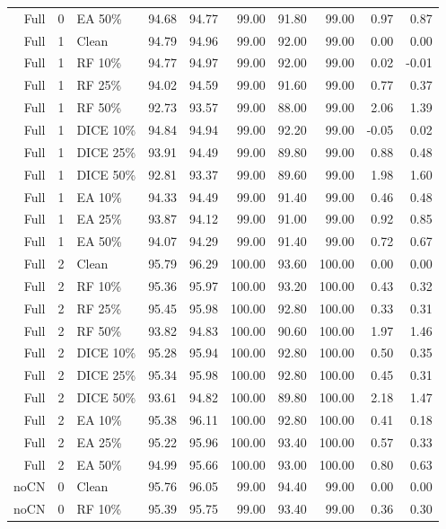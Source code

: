 {\begin{longtable}{rllrrrrrrr}
Full & 0 & EA 50\% & 94.68 & 94.77 & 99.00 & 91.80 & 99.00 & 0.97 & 0.87 \\
Full & 1 & Clean & 94.79 & 94.96 & 99.00 & 92.00 & 99.00 & 0.00 & 0.00 \\
Full & 1 & RF 10\% & 94.77 & 94.97 & 99.00 & 92.00 & 99.00 & 0.02 & -0.01 \\
Full & 1 & RF 25\% & 94.02 & 94.59 & 99.00 & 91.60 & 99.00 & 0.77 & 0.37 \\
Full & 1 & RF 50\% & 92.73 & 93.57 & 99.00 & 88.00 & 99.00 & 2.06 & 1.39 \\
Full & 1 & DICE 10\% & 94.84 & 94.94 & 99.00 & 92.20 & 99.00 & -0.05 & 0.02 \\
Full & 1 & DICE 25\% & 93.91 & 94.49 & 99.00 & 89.80 & 99.00 & 0.88 & 0.48 \\
Full & 1 & DICE 50\% & 92.81 & 93.37 & 99.00 & 89.60 & 99.00 & 1.98 & 1.60 \\
Full & 1 & EA 10\% & 94.33 & 94.49 & 99.00 & 91.40 & 99.00 & 0.46 & 0.48 \\
Full & 1 & EA 25\% & 93.87 & 94.12 & 99.00 & 91.00 & 99.00 & 0.92 & 0.85 \\
Full & 1 & EA 50\% & 94.07 & 94.29 & 99.00 & 91.40 & 99.00 & 0.72 & 0.67 \\
Full & 2 & Clean & 95.79 & 96.29 & 100.00 & 93.60 & 100.00 & 0.00 & 0.00 \\
Full & 2 & RF 10\% & 95.36 & 95.97 & 100.00 & 93.20 & 100.00 & 0.43 & 0.32 \\
Full & 2 & RF 25\% & 95.45 & 95.98 & 100.00 & 92.80 & 100.00 & 0.33 & 0.31 \\
Full & 2 & RF 50\% & 93.82 & 94.83 & 100.00 & 90.60 & 100.00 & 1.97 & 1.46 \\
Full & 2 & DICE 10\% & 95.28 & 95.94 & 100.00 & 92.80 & 100.00 & 0.50 & 0.35 \\
Full & 2 & DICE 25\% & 95.34 & 95.98 & 100.00 & 92.80 & 100.00 & 0.45 & 0.31 \\
Full & 2 & DICE 50\% & 93.61 & 94.82 & 100.00 & 89.80 & 100.00 & 2.18 & 1.47 \\
Full & 2 & EA 10\% & 95.38 & 96.11 & 100.00 & 92.80 & 100.00 & 0.41 & 0.18 \\
Full & 2 & EA 25\% & 95.22 & 95.96 & 100.00 & 93.40 & 100.00 & 0.57 & 0.33 \\
Full & 2 & EA 50\% & 94.99 & 95.66 & 100.00 & 93.00 & 100.00 & 0.80 & 0.63 \\
noCN & 0 & Clean & 95.76 & 96.05 & 99.00 & 94.40 & 99.00 & 0.00 & 0.00 \\
noCN & 0 & RF 10\% & 95.39 & 95.75 & 99.00 & 93.40 & 99.00 & 0.36 & 0.30 \\

\end{longtable}}
